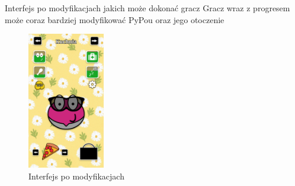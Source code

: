 \documentclass{beamer}
\begin{document}
\begin{frame}{Interfejs po modyfikacjach jakich może dokonać gracz}
    Gracz wraz z progresem może coraz bardziej modyfikować PyPou oraz jego otoczenie
    \begin{figure}
        \centering
        \includegraphics[width=0.3\textwidth]{grafiki/prototypUI_kuchnia1.png}
        \caption{Interfejs po modyfikacjach}
        \label{fig:UI2}
    \end{figure}
\end{frame}
\end{document}
